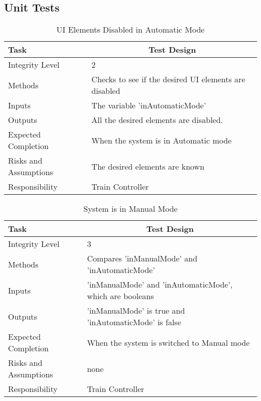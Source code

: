 \documentclass[]{article}
\begin{document}
\subsection{Unit Tests}

\begin{table}[H]
	\centering
	\caption{UI Elements Disabled in Automatic Mode}
	\begin{tabular}{|l|l|}
		\hline
		Task & \multicolumn{1}{c|}{Test Design} \\ \hline
		Integrity Level & 2 \\ \hline
		Methods & Checks to see if the desired UI elements are disabled\\ \hline
		Inputs & The variable 'inAutomaticMode'\\ \hline
		Outputs & All the desired elements are disabled. \\ \hline
		Expected Completion & When the system is in Automatic mode\\ \hline
		Risks and Assumptions & The desired elements are known\\ \hline
		Responsibility & Train Controller\\ \hline
	\end{tabular}
\end{table}

\begin{table}[H]
	\centering
	\caption{System is in Manual Mode}
	\begin{tabular}{|l|l|}
		\hline
		Task & \multicolumn{1}{c|}{Test Design} \\ \hline
		Integrity Level & 3 \\ \hline
		Methods & Compares 'inManualMode' and 'inAutomaticMode'\\ \hline
		Inputs & 'inManualMode' and 'inAutomaticMode', which are booleans\\ \hline
		Outputs & 'inManualMode' is true and 'inAutomaticMode' is false \\ \hline
		Expected Completion & When the system is switched to Manual mode\\ \hline
		Risks and Assumptions & none\\ \hline
		Responsibility & Train Controller\\ \hline
	\end{tabular}
\end{table}
\end{document}
